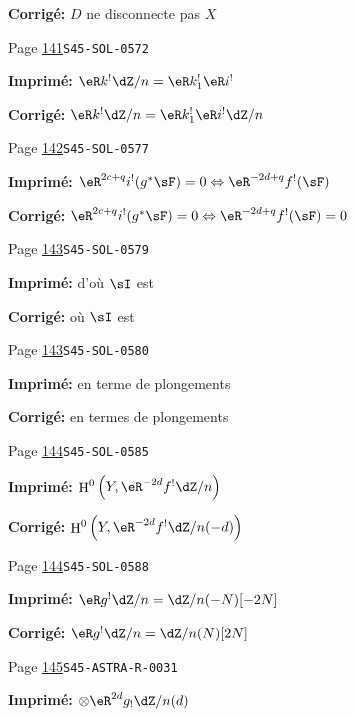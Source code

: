 \documentclass[oneside]{book}
\DeclareMathOperator{\h}{H}
\theoremstyle{sga-source}
\theoremstyle{sga-source-dash}
\theoremstyle{sga-source-dotdash}
\theoremstyle{sga-source-number-note-dash}
\theoremstyle{sga-source-note-number-dotdash}
\theoremstyle{sga-source-example-dotdash}
\theoremstyle{sga-source-inline-number}
\theoremstyle{sga-source-bare-number}
\theoremstyle{sga-source}
\begin{document}
\begin{description}
\par\noindent\textbf{Corrigé:} $D$ ne disconnecte pas $X$
\smallskip
\item[\hypertarget{apparatus:FR-0097}{97}] Page \hyperlink{printpage:fr:141}{141}\quad\texttt{S45-SOL-0572}
\par\noindent\textbf{Imprimé:} \(\eR k^! \dZ/n=\eR k_1^! \eR i^!\)
\par\noindent\textbf{Corrigé:} \(\eR k^! \dZ/n=\eR k_1^! \eR i^!\dZ/n\)
\smallskip
\item[\hypertarget{apparatus:FR-0098}{98}] Page \hyperlink{printpage:fr:142}{142}\quad\texttt{S45-SOL-0577}
\par\noindent\textbf{Imprimé:} \(\eR^{2 c+q} i^!(g^*\sF)=0\Leftrightarrow \eR^{-2 d+q}f^!(\sF)\)
\par\noindent\textbf{Corrigé:} \(\eR^{2 c+q} i^!(g^*\sF)=0\Leftrightarrow \eR^{-2 d+q}f^!(\sF)=0\)
\smallskip
\item[\hypertarget{apparatus:FR-0099}{99}] Page \hyperlink{printpage:fr:143}{143}\quad\texttt{S45-SOL-0579}
\par\noindent\textbf{Imprimé:} d'où $\sI$ est
\par\noindent\textbf{Corrigé:} où $\sI$ est
\smallskip
\item[\hypertarget{apparatus:FR-0100}{100}] Page \hyperlink{printpage:fr:143}{143}\quad\texttt{S45-SOL-0580}
\par\noindent\textbf{Imprimé:} en terme de plongements
\par\noindent\textbf{Corrigé:} en termes de plongements
\smallskip
\item[\hypertarget{apparatus:FR-0101}{101}] Page \hyperlink{printpage:fr:144}{144}\quad\texttt{S45-SOL-0585}
\par\noindent\textbf{Imprimé:} \(\h^0\left(Y,\eR^{-2 d}f^!\dZ/n\right)\)
\par\noindent\textbf{Corrigé:} \(\h^0\left(Y,\eR^{-2 d}f^!\dZ/n(-d)\right)\)
\smallskip
\item[\hypertarget{apparatus:FR-0102}{102}] Page \hyperlink{printpage:fr:144}{144}\quad\texttt{S45-SOL-0588}
\par\noindent\textbf{Imprimé:} \(\eR g^! \dZ/n=\dZ/n(-N)[-2 N]\)
\par\noindent\textbf{Corrigé:} \(\eR g^! \dZ/n=\dZ/n(N)[2 N]\)
\smallskip
\item[\hypertarget{apparatus:FR-0103}{103}] Page \hyperlink{printpage:fr:145}{145}\quad\texttt{S45-ASTRA-R-0031}
\par\noindent\textbf{Imprimé:} \(\otimes \eR^{2 d} g_!\dZ/n(d)\)

\end{description}
\end{document}
